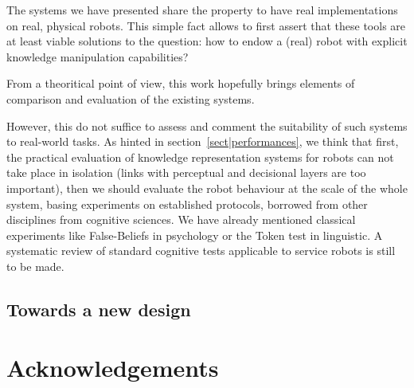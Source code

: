 \documentclass[a4paper, twocolumn]{article}
\begin{document}
The systems we have presented share the property to have real implementations
on real, physical robots. This simple fact allows to first assert that these
tools are at least viable solutions to the question: how to endow a (real)
robot with explicit knowledge manipulation capabilities?

From a theoritical point of view, this work hopefully brings elements of
comparison and evaluation of the existing systems.

However, this do not suffice to assess and comment the suitability of such
systems to real-world tasks. As hinted in section~\ref{sect|performances}, we
think that first, the practical evaluation of knowledge representation systems
for robots can not take place in isolation (links with perceptual and
decisional layers are too important), then we should evaluate the robot
behaviour at the scale of the whole system, basing experiments on established
protocols, borrowed from other disciplines from cognitive sciences. We have
already mentioned classical experiments like False-Beliefs in psychology or the
Token test in linguistic. A systematic review of standard cognitive tests
applicable to service robots is still to be made.

\subsection{Towards a new design}

\section*{Acknowledgements} 




\end{document}
